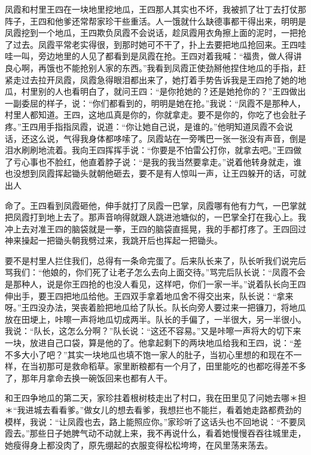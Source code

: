 \documentclass[12pt,UTF8]{ctexbook}
\begin{document}
凤霞和村里王四在一块地里挖地瓜，王四那人其实也不坏，我被抓了壮丁去打仗那阵子，王四和他爹还常帮家珍干些重活。人一饿就什么缺德事都干得出来，明明是凤霞挖到一个地瓜，王四欺负凤霞不会说话，趁凤霞用衣角擦上面的泥时，一把抢了过去。凤霞平常老实得很，到那时她可不干了，扑上去要把地瓜抢回来。王四哇哇一叫，旁边地里的人见了都看到是凤霞在抢。王四对着我喊：“福贵，做人得讲良心啊，再饿也不能抢别人家的东西。”我看到凤霞正使劲掰他捏住地瓜的手指，赶紧走过去拉开凤霞，凤霞急得眼泪都出来了，她打着手势告诉我是王四抢了她的地瓜，村里别的人也看明白了，就问王四：“是你抢她的？还是她抢你的？”王四做出一副委屈的样子，说：“你们都看到的，明明是她在抢。”我说：“凤霞不是那种人，村里人都知道。王四，这地瓜真是你的，你就拿走。要不是你的，你吃了也会肚子疼。”王四用手指指凤霞，说道：“你让她自己说，是谁的。”他明知道凤霞不会说话，还这么说，气得我身体都哆嗦了。凤霞站在一旁嘴巴一张一张没有声音，倒是泪水刷刷地流着。我向王四挥挥手说：“你要是不怕雷公打你，就拿去吧。”王四做了亏心事也不脸红，他直着脖子说：“是我的我当然要拿走。”说着他转身就走，谁也没想到凤霞挥起锄头就朝他砸去，要不是有人惊叫一声，让王四躲开的话，可就出人


命了。王四看到凤霞砸他，伸手就打了凤霞一巴掌，凤霞哪有他有力气，一巴掌就把凤霞打到地上去了。那声音响得就跟人跳进池塘似的，一巴掌全打在我心上。我冲上去对准王四的脑袋就是一拳，王四的脑袋直摇晃，我的手都打疼了。王四回过神来操起一把锄头朝我劈过来，我跳开后也挥起一把锄头。

要不是村里人拦住我们，总得有一条命完蛋了。后来队长来了，队长听我们说完后骂我们：“他娘的，你们死了让老子怎么去向上面交待。”骂完后队长说：“凤霞不会是那种人，说是你王四抢的也没人看见，这样吧，你们一家一半。”说着队长向王四伸出手，要王四把地瓜给他。王四双手拿着地瓜舍不得交出来，队长说：“拿来呀。”王四没办法，哭丧着脸把地瓜给了队长。队长向旁人要过来一把镰刀，将地瓜放在田埂上，咔嚓一声将地瓜切成两半。队长的手偏了，一半很大，另一半很小。我说：“队长，这怎么分啊？”队长说：“这还不容易。”又是咔嚓一声将大的切下来一块，放进自己口袋，算是他的了。他拿起剩下的两块地瓜给我和王四，说：“差不多大小了吧？”其实一块地瓜也填不饱一家人的肚子，当初心里想的和现在不一样，在当初那可是救命稻草。家里断粮都有一个月了，田里能吃的也都吃得差不多了，那年月拿命去换一碗饭回来也都有人干。

和王四争地瓜的第二天，家珍拄着根树枝走出了村口，我在田里见了问她去哪＊担＊“我进城去看看爹。”做女儿的想去看爹，我想拦也不能拦，看着她走路都费劲的模样，我说：“让凤霞也去，路上能照应你。”家珍听了这话头也不回地说：“不要凤霞去。”那些日子她脾气动不动就上来，我不再说什么，看着她慢慢吞吞往城里走，她瘦得身上都没肉了，原先绷起的衣服变得松松垮垮，在风里荡来荡去。
\end{document}
